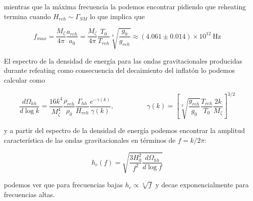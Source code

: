 \noindent
mientras que la máxima frecuencia la podemos encontrar pidiendo que reheating termina cuando $H_{reh} \sim \Gamma_{SM}$ lo que implica que 

\begin{equation}
    f_{max} = \frac{M_\zeta}{4 \pi} \frac{a_{reh}}{a_0} = \frac{M_{\zeta}}{4 \pi} \frac{T_0}{T_{reh}} \sqrt[3]{\frac{g_0}{g_{reh}}} \approx (4.061 \pm 0.014) \times 10^{12} ~ \text{Hz}
\end{equation}

El espectro de la densidad de energía para las ondas gravitacionales producidas durante refeating como consecuencia del decaimiento del inflatón lo podemos calcular como

\begin{equation}
    \frac{d \Omega_{hh}}{d \log k} = \frac{16 k^4}{M^4_\zeta} \frac{\rho_{reh}}{\rho_0} \frac{\Gamma_{hh}}{H_{reh}} \frac{e^{-\gamma(k)}}{\gamma(k)}, \hspace{2cm} \gamma(k) = \left[ \sqrt[3]{\frac{g_{reh}}{g_0}} \frac{T_{reh}}{T_0} \frac{2k}{M_\zeta} \right]^{3/2}
\end{equation}

\noindent
y a partir del espectro de la densidad de energía podemos encontrar la amplitud característica de las ondas gravitacionales en términos de $f = k/2\pi$:

\begin{equation}
    h_c (f) = \sqrt{\frac{3 H_0^2}{f^2} \frac{d \Omega_{hh}}{d \log f}}
\end{equation}

\noindent
podemos ver que para frecuencias bajas $h_c \propto \sqrt[4]{f}$ y decae exponencialmente para frecuencias altas.